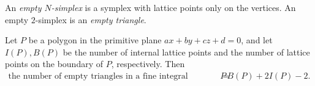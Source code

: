 \documentclass[11pt,a4paper,leqno,noamsfonts]{amsart}
\numberwithin{equation}{section}
\begin{document}
\begin{definition} An \emph{empty $N$-simplex} is a symplex with lattice points only on the vertices. An empty $2$-simplex is an \emph{empty triangle}.
    
\end{definition}
\begin{lemma}\label{number B I}
    Let $P$ be a polygon in the primitive plane $ax+by+cz+d=0$, and let $I(P), B(P)$ be the number of internal lattice points and the number of lattice points on the boundary of $P$, respectively. Then
    \begin{align*}
        \text{the number of empty triangles in a fine integral triangulation of $P$}=&B(P)+2I(P)-2.
    \end{align*}
    
\end{lemma}
\end{document}
